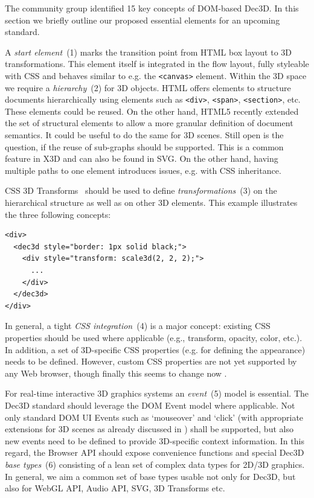 \documentclass{acmsiggraph}
\begin{document}
The community group identified 15 key concepts of DOM-based Dec3D. In this section we briefly outline our proposed essential elements for an upcoming standard. 

A \textit{start element}~(1) marks the transition point from HTML box layout to 3D transformations. This element itself is integrated in the flow layout, fully styleable with CSS and behaves similar to e.g. the \verb|<canvas>| element. Within the 3D space we require a \textit{hierarchy}~(2) for 3D objects. HTML offers elements to structure documents hierarchically using elements such as \verb|<div>|, \verb|<span>|, \verb|<section>|, etc. These elements could be reused. On the other hand, HTML5 recently extended the set of structural elements to allow a more granular definition of document semantics. It could be useful to do the same for 3D scenes. Still open is the question, if the reuse of sub-graphs should be supported. This is a common feature in X3D and can also be found in SVG. On the other hand, having multiple paths to one element introduces issues, e.g. with CSS inheritance. 

CSS 3D Transforms~\cite{webkit3DCSS} should be used to define \textit{transformations}~(3) on the hierarchical structure as well as on other 3D elements. This example illustrates the three following concepts:

\small
\begin{verbatim}
<div>
  <dec3d style="border: 1px solid black;">
    <div style="transform: scale3d(2, 2, 2);">
      ...
    </div>
  </dec3d>
</div>
\end{verbatim}
\normalsize

In general, a tight \textit{CSS integration}~(4) is a major concept: existing CSS properties should be used where applicable (e.g., transform, opacity, color, etc.). In addition, a set of 3D-specific CSS properties (e.g. for defining the appearance) needs to be defined. However, custom CSS properties are not yet supported by any Web browser, though finally this seems to change now \cite{CSSCustom}.

For real-time interactive 3D graphics systems an \textit{event}~(5) model is essential. The Dec3D standard should leverage the DOM Event model where applicable. Not only standard DOM UI Events such as `mouseover' and `click' (with appropriate extensions for 3D scenes as already discussed in \cite{BehrJDA11}) shall be supported, but also new events need to be defined to provide 3D-specific context information. In this regard, the Browser API should expose convenience functions and special Dec3D \textit{base types}~(6) consisting of a lean set of complex data types for 2D/3D graphics. In general, we aim a common set of base types usable not only for Dec3D, but also for WebGL API, Audio API, SVG, 3D Transforms etc.
\end{document}

